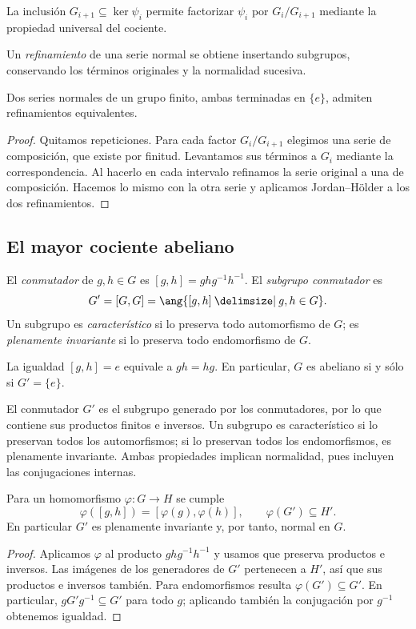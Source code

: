 \begin{obs}
La inclusión $G_{i+1}\subseteq\ker\psi_i$ permite factorizar $\psi_i$ por $G_i/G_{i+1}$ mediante la propiedad universal del cociente.
\end{obs}

\begin{defi}
Un \emph{refinamiento} de una serie normal se obtiene insertando subgrupos, conservando los términos originales y la normalidad sucesiva.
\end{defi}
\begin{prop}
Dos series normales de un grupo finito, ambas terminadas en $\{e\}$, admiten refinamientos equivalentes.
\end{prop}
\begin{proof}
Quitamos repeticiones. Para cada factor $G_i/G_{i+1}$ elegimos una serie de composición, que existe por finitud. Levantamos sus términos a $G_i$ mediante la correspondencia. Al hacerlo en cada intervalo refinamos la serie original a una de composición. Hacemos lo mismo con la otra serie y aplicamos Jordan--Hölder a los dos refinamientos.
\end{proof}

\subsection{El mayor cociente abeliano}\label{tema:8-3-1}
\begin{defi}
El \emph{conmutador} de $g,h\in G$ es $[g,h]=ghg^{-1}h^{-1}$. El \emph{subgrupo conmutador} es
\[
G'=[G,G]=\ang{[g,h]\given g,h\in G}.
\]
Un subgrupo es \emph{característico} si lo preserva todo automorfismo de $G$; es \emph{plenamente invariante} si lo preserva todo endomorfismo de $G$.
\end{defi}
La igualdad $[g,h]=e$ equivale a $gh=hg$. En particular, $G$ es abeliano si y sólo si $G'=\{e\}$.
\begin{obs}
El conmutador $G'$ es el subgrupo generado por los conmutadores, por lo que contiene sus productos finitos e inversos. Un subgrupo es característico si lo preservan todos los automorfismos; si lo preservan todos los endomorfismos, es plenamente invariante. Ambas propiedades implican normalidad, pues incluyen las conjugaciones internas.
\end{obs}

\begin{lema}\label{lema:C8-conmutadores}
Para un homomorfismo $\varphi:G\to H$ se cumple
\[
\varphi([g,h])=[\varphi(g),\varphi(h)],\qquad
\varphi(G')\subseteq H'.
\]
En particular $G'$ es plenamente invariante y, por tanto, normal en $G$.
\end{lema}
\begin{proof}
Aplicamos $\varphi$ al producto $ghg^{-1}h^{-1}$ y usamos que preserva productos e inversos. Las imágenes de los generadores de $G'$ pertenecen a $H'$, así que sus productos e inversos también. Para endomorfismos resulta $\varphi(G')\subseteq G'$. En particular, $gG'g^{-1}\subseteq G'$ para todo $g$; aplicando también la conjugación por $g^{-1}$ obtenemos igualdad.
\end{proof}

